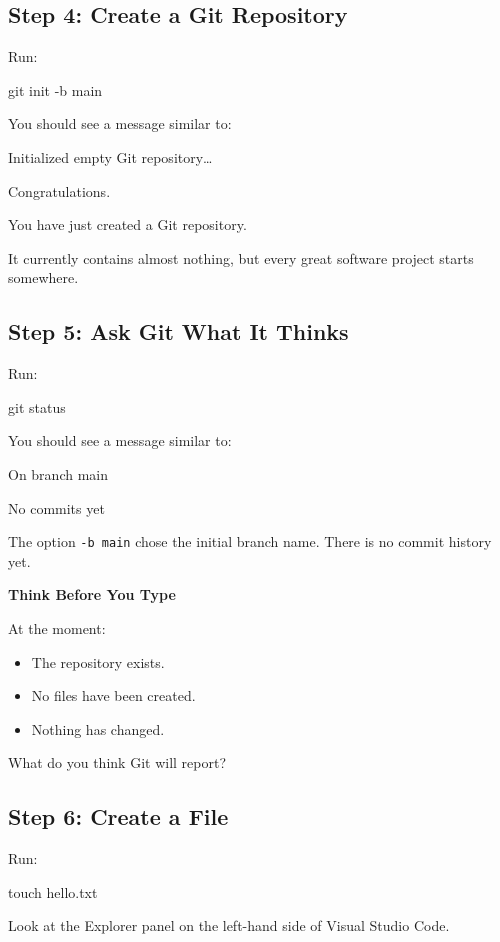 \documentclass{csc2059practical}
\begin{document}
\subsection{Step 4: Create a Git Repository}
Run:

\begin{terminalplain}
git init -b main
\end{terminalplain}
You should see a message similar to:

\begin{terminalplain}
Initialized empty Git repository\ldots{}
\end{terminalplain}
Congratulations.

You have just created a Git repository.

It currently contains almost nothing, but every great software project starts somewhere.

\subsection{Step 5: Ask Git What It Thinks}
Run:

\begin{terminalplain}
git status
\end{terminalplain}
You should see a message similar to:

\begin{terminalplain}
On branch main

No commits yet
\end{terminalplain}
The option \texttt{-b main} chose the initial branch name. There is no commit history yet.

\begin{reflectionbox}
\textbf{Think Before You Type}\par
\medskip
At the moment:
\begin{itemize}
  \item The repository exists.
  \item No files have been created.
  \item Nothing has changed.
\end{itemize}
What do you think Git will report?
\end{reflectionbox}

\subsection{Step 6: Create a File}
Run:

\begin{terminalplain}
touch hello.txt
\end{terminalplain}
Look at the Explorer panel on the left-hand side of Visual Studio Code.
\end{document}
